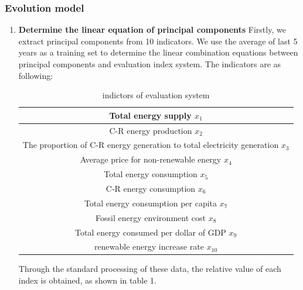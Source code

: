 \documentclass{mcmthesis}
\begin{document}
        \subsubsection{Evolution model}
        \begin{enumerate}
          \item \textbf{Determine the linear equation of principal components}
        Firstly, we extract principal components from 10 indicators. We use the average of last 5 years as a training set to determine the linear combination equations between principal components and evaluation index system.
      The indicators are as following:
      \begin{table}
      \begin{tabular}{|c|}
      \hline
      {Total energy supply $x_1$}\\
      \hline
      {C-R energy production $x_2$}\\
      \hline
      {The proportion of C-R energy generation to total electricity generation $x_3$}\\
      \hline
      { Average price for non-renewable energy $x_4$}\\
      \hline
      { Total energy consumption $x_5$}\\
      \hline
      { C-R energy consumption $x_6$}\\
      \hline
      { Total energy consumption per capita $x_7$}\\
      \hline
      {  Fossil energy environment cost $x_8$}\\
      \hline
      { Total energy consumed per dollar of GDP $x_9$}\\
      \hline
      {renewable energy increase rate $x_{10}$}\\
      \hline
      \end{tabular}
      \caption{indictors of evaluation system}

      \end{table}



      Through the standard processing of these data, the relative value of each index is obtained, as shown in table 1.


\end{enumerate}
\end{document}
